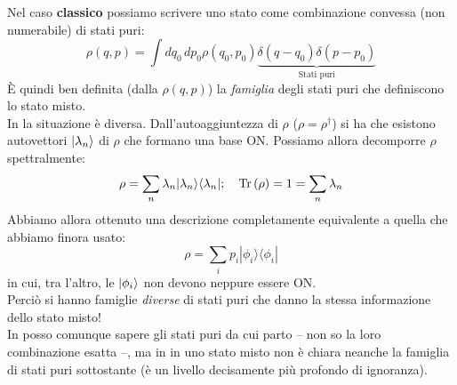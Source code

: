 \documentclass[../../FisicaTeorica.tex]{subfiles}
\begin{document}
Nel caso \textbf{classico} possiamo scrivere uno stato come combinazione convessa (non numerabile) di stati puri:
\[
\rho \left(q,p\right)=\int dq_0\,dp_0 \rho \left(q_0,p_0\right) \underbrace{\delta \left(q-q_0\right)\delta \left(p-p_0\right)}_{\text{Stati puri}}
\]
È quindi ben definita (dalla $\rho(q,p)$) la \textit{famiglia} degli stati puri che definiscono lo stato misto.\\
In \MQ la situazione è diversa. Dall'autoaggiuntezza di $\rho$  ($\rho = \rho^\dag$) si ha che esistono autovettori $\ket{\lambda_n}$ di $\rho$ che formano una base ON. Possiamo allora
decomporre $\rho$ spettralmente:
\[
\rho =\sum_{n}{\lambda_n|\lambda_n\rangle\langle\lambda_n|};\quad \operatorname{Tr}\left(\rho\right)=1= \sum_{n}\lambda_n
\]
Abbiamo allora ottenuto una descrizione completamente equivalente a quella che abbiamo finora usato:
\[
\rho = \sum_{i}{p_i|\phi_i\rangle\langle\phi_i|}
\]
in cui, tra l'altro, le $\ket{\phi_i}$ non devono neppure essere ON.\\
Perciò si hanno famiglie \textit{diverse} di stati puri che danno la stessa informazione dello stato misto!\\
In \MC posso comunque sapere gli stati puri da cui parto -- non so la loro combinazione esatta --, ma in \MQ in uno stato misto non è chiara neanche la famiglia di stati puri sottostante (è un livello decisamente più profondo di ignoranza).
\end{document}
